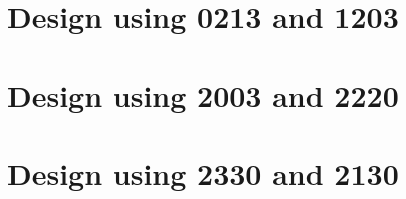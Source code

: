 
 \begin{center}




 \end{center}



\section{Design using 0213 and 1203}


 \begin{center}




 \end{center}



\section{Design using 2003 and 2220}


 \begin{center}




 \end{center}



\section{Design using 2330 and 2130}


